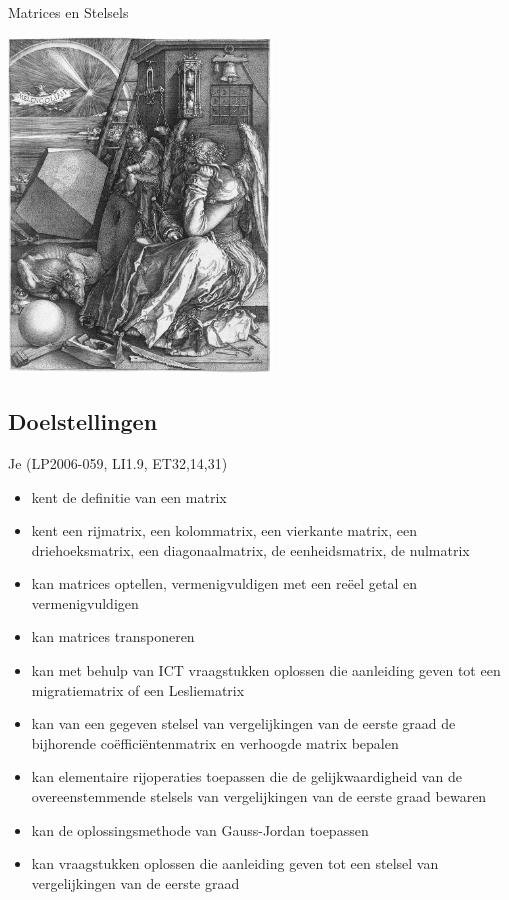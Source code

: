 \documentclass[12pt,twoside]{article}
\begin{document}
\thispagestyle{empty}
\begin{center}
  \begin{mdframed}
    \centering
    \fontsize{40}{60}\selectfont Matrices en Stelsels
  \end{mdframed}
  \includegraphics[width=7cm]{magicsquare}
\end{center}

\subsection*{Doelstellingen}
\begin{singlespacing}
  Je \hfill  {\scriptsize(LP2006-059, LI1.9, ET32,14,31)}
  \begin{itemize}
    \itemsep-0.2em
  \item kent de definitie van een matrix
  \item kent een rijmatrix, een kolommatrix, een vierkante matrix, een driehoeksmatrix, een diagonaalmatrix, de eenheidsmatrix, de nulmatrix
  \item kan matrices optellen, vermenigvuldigen met een reëel getal en vermenigvuldigen
  \item kan matrices transponeren
  \item kan met behulp van ICT vraagstukken oplossen die aanleiding geven tot een migratiematrix of een Lesliematrix
  \item kan van een gegeven stelsel van vergelijkingen van de eerste graad de bijhorende coëf\-ficiëntenmatrix en verhoogde matrix bepalen
  \item kan elementaire rijoperaties toepassen die de gelijkwaardigheid van de overeenstemmende stelsels van vergelijkingen van de eerste graad bewaren
  \item kan de oplossingsmethode van Gauss-Jordan toepassen
  \item kan vraagstukken oplossen die aanleiding geven tot een stelsel van vergelijkingen van de eerste graad
  \end{itemize}
\end{singlespacing}
\end{document}
